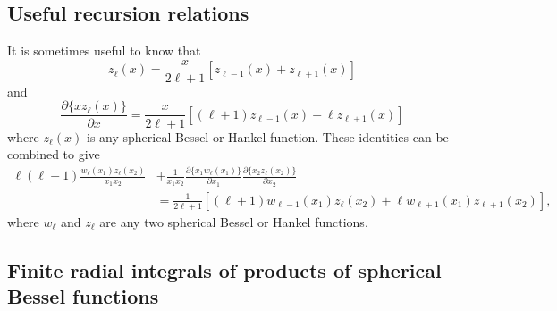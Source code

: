 \documentclass{article}
\begin{document}
\subsection{Useful recursion relations}
It is sometimes useful to know that
\begin{equation}
z_\ell(x) = \frac{x}{2\ell + 1}\left[z_{\ell - 1}(x) + z_{\ell + 1}(x)\right]
\end{equation}
and
\begin{equation}
\frac{\partial\{xz_\ell(x)\}}{\partial x} = \frac{x}{2\ell + 1}\left[(\ell + 1)z_{\ell - 1}(x) - \ell z_{\ell + 1}(x)\right]
\end{equation}
where $z_\ell(x)$ is any spherical Bessel or Hankel function. These identities can be combined to give
\begin{equation}
\begin{split}
\ell(\ell + 1)\frac{w_\ell(x_1)z_\ell(x_2)}{x_1x_2} &+ \frac{1}{x_1x_2}\frac{\partial\{x_1w_\ell(x_1)\}}{\partial x_1}\frac{\partial\{x_2z_\ell(x_2)\}}{\partial x_2}\\
&= \frac{1}{2\ell + 1}\left[(\ell + 1)w_{\ell - 1}(x_1)z_\ell(x_2) + \ell w_{\ell + 1}(x_1)z_{\ell + 1}(x_2)\right],
\end{split}
\end{equation}
where $w_\ell$ and $z_\ell$ are any two spherical Bessel or Hankel functions.









\subsection{Finite radial integrals of products of spherical Bessel functions}\label{sec:finiteRadialIntegrals}
\end{document}

